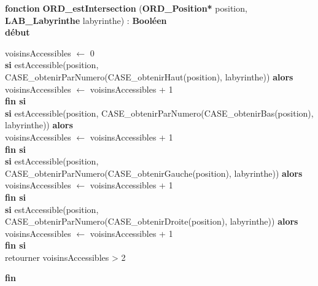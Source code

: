 \noindent\textbf{fonction} \textbf{ORD\_estIntersection} (\textbf{ORD\_Position*} position, \textbf{LAB\_Labyrinthe} labyrinthe) : \textbf{Booléen}\\
\textbf{début}
\begin{flushleft}
    \hspace*{1cm}voisinsAccessibles $\gets$ 0\\
    \hspace*{1cm}\textbf{si} estAccessible(position, CASE\_obtenirParNumero(CASE\_obtenirHaut(position), labyrinthe)) \textbf{alors}\\
    \hspace*{2cm}voisinsAccessibles $\gets$ voisinsAccessibles + 1\\
    \hspace*{1cm}\textbf{fin si}\\
    \hspace*{1cm}\textbf{si} estAccessible(position, CASE\_obtenirParNumero(CASE\_obtenirBas(position), labyrinthe)) \textbf{alors}\\
    \hspace*{2cm}voisinsAccessibles $\gets$ voisinsAccessibles + 1\\
    \hspace*{1cm}\textbf{fin si}\\
    \hspace*{1cm}\textbf{si} estAccessible(position, CASE\_obtenirParNumero(CASE\_obtenirGauche(position), labyrinthe)) \textbf{alors}\\
    \hspace*{2cm}voisinsAccessibles $\gets$ voisinsAccessibles + 1\\
    \hspace*{1cm}\textbf{fin si}\\
    \hspace*{1cm}\textbf{si} estAccessible(position, CASE\_obtenirParNumero(CASE\_obtenirDroite(position), labyrinthe)) \textbf{alors}\\
    \hspace*{2cm}voisinsAccessibles $\gets$ voisinsAccessibles + 1\\
    \hspace*{1cm}\textbf{fin si}\\
    \hspace*{1cm}retourner voisinsAccessibles > 2
\end{flushleft}
\textbf{fin}\\

